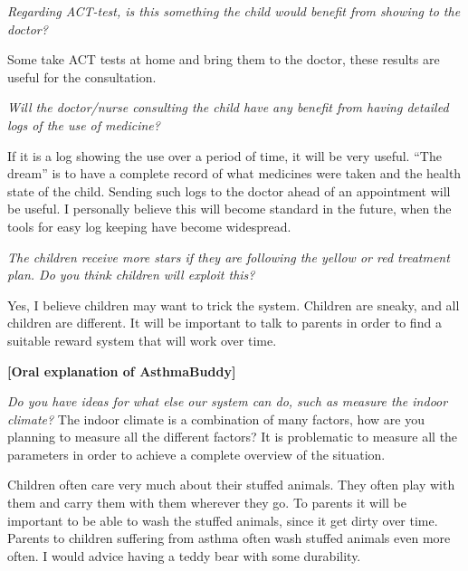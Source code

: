 \emph{Regarding ACT-test, is this something the child would benefit from showing to the doctor?}

Some take ACT tests at home and bring them to the doctor, these results are useful for the consultation.

\emph{Will the doctor/nurse consulting the child have any benefit from having detailed logs of the use of medicine?}

If it is a log showing the use over a period of time, it will be very useful. ``The dream'' is to have a complete record of what medicines were taken and the health state of the child. Sending such logs to the doctor ahead of an appointment will be useful. I personally believe this will become standard in the future, when the tools for easy log keeping have become widespread.

\emph{The children receive more stars if they are following the yellow or red treatment plan. Do you think children will exploit this?} 

Yes, I believe children may want to trick the system. Children are sneaky, and all children are different. It will be important to talk to parents in order to find a suitable reward system that will work over time. 

\textbf{[Oral explanation of AsthmaBuddy]}

\emph{Do you have ideas for what else our system can do, such as measure the indoor climate?}
The indoor climate is a combination of many factors, how are you planning to measure all the different factors? It is problematic to measure all the parameters in order to achieve a complete overview of the situation. 

Children often care very much about their stuffed animals. They often play with them and carry them with them wherever they go. To parents it will be important to be able to wash the stuffed animals, since it get dirty over time. Parents to children suffering from asthma often wash stuffed animals even more often. I would advice having a teddy bear with some durability.
